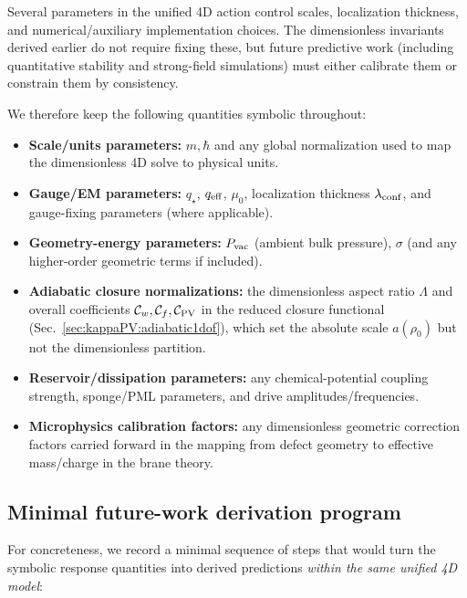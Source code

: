 \documentclass[11pt]{article}
\newcommand{\qstar}{q_\star}
\newcommand{\qeff}{q_{\rm eff}}
\begin{document}
Several parameters in the unified 4D action control scales, localization thickness, and numerical/auxiliary
implementation choices. The dimensionless invariants derived earlier do not require fixing these, but
future predictive work (including quantitative stability and strong-field simulations) must either calibrate
them or constrain them by consistency.

We therefore keep the following quantities symbolic throughout:
\begin{itemize}
  \item \textbf{Scale/units parameters:} $m,\hbar$ and any global normalization used to map the dimensionless 4D solve to physical units.
  \item \textbf{Gauge/EM parameters:} $\qstar$, $\qeff$, $\mu_0$, localization thickness $\lambda_{\rm conf}$, and gauge-fixing parameters (where applicable).
  \item \textbf{Geometry-energy parameters:} $P_{\rm vac}$ (ambient bulk pressure), $\sigma$ (and any higher-order geometric terms if included).
  \item \textbf{Adiabatic closure normalizations:} the dimensionless aspect ratio \(\Lambda\) and overall coefficients \(\mathcal{C}_w,\mathcal{C}_f,\mathcal{C}_{\rm PV}\) in the reduced closure functional (Sec.~\ref{sec:kappaPV:adiabatic1dof}), which set the absolute scale \(a(\rho_0)\) but not the dimensionless partition.
  \item \textbf{Reservoir/dissipation parameters:} any chemical-potential coupling strength, sponge/PML parameters, and drive amplitudes/frequencies.
  \item \textbf{Microphysics calibration factors:} any dimensionless geometric correction factors carried forward in the mapping from defect geometry
        to effective mass/charge in the brane theory.
\end{itemize}

\subsection{Minimal future-work derivation program}
\label{sec:undetermined:program}

For concreteness, we record a minimal sequence of steps that would turn the symbolic response quantities
into derived predictions \emph{within the same unified 4D model}:
\end{document}
